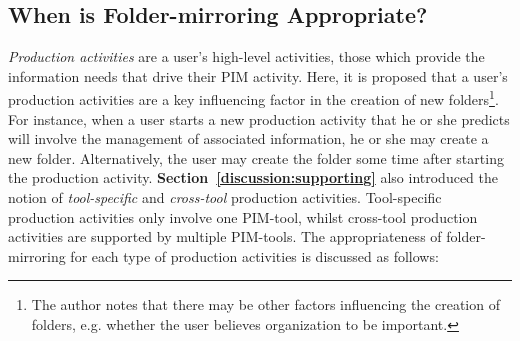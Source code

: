 
\subsection{When is Folder-mirroring Appropriate?}

\textit{Production activities} are a user's high-level activities, those which provide the information needs that drive their PIM activity.  Here, it is proposed that a user's production activities are a key influencing factor in the creation of new folders\footnote{The author notes that there may be other factors influencing the creation of folders, e.g. whether the user believes organization to be important.}.  For instance, when a user starts a new production activity that he or she predicts will involve the management of associated information, he or she may create a new folder. Alternatively, the user may create the folder some time after starting the production activity.
\textbf{Section~\ref{discussion:supporting}} also introduced the notion of \textit{tool-specific} and \textit{cross-tool} production activities.  Tool-specific production activities only involve one PIM-tool, whilst cross-tool production activities are supported by multiple PIM-tools.  The appropriateness of folder-mirroring for each type of production activities is discussed as follows:

